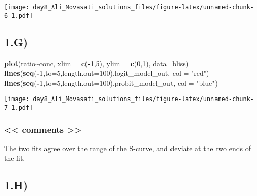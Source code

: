 \documentclass[
]{article}
\newenvironment{Shaded}{\begin{snugshade}}{\end{snugshade}}
\newcommand{\AttributeTok}[1]{\textcolor[rgb]{0.13,0.29,0.53}{#1}}
\newcommand{\DecValTok}[1]{\textcolor[rgb]{0.00,0.00,0.81}{#1}}
\newcommand{\FunctionTok}[1]{\textcolor[rgb]{0.13,0.29,0.53}{\textbf{#1}}}
\newcommand{\NormalTok}[1]{#1}
\newcommand{\SpecialCharTok}[1]{\textcolor[rgb]{0.81,0.36,0.00}{\textbf{#1}}}
\newcommand{\StringTok}[1]{\textcolor[rgb]{0.31,0.60,0.02}{#1}}
\begin{document}
\texttt{[image: day8\_Ali\_Movasati\_solutions\_files/figure-latex/unnamed-chunk-6-1.pdf]}

\subsection{1.G)}\label{g}

\begin{Shaded}
\begin{Highlighting}[]
\FunctionTok{plot}\NormalTok{(ratio}\SpecialCharTok{\textasciitilde{}}\NormalTok{conc, }\AttributeTok{xlim =} \FunctionTok{c}\NormalTok{(}\SpecialCharTok{{-}}\DecValTok{1}\NormalTok{,}\DecValTok{5}\NormalTok{), }\AttributeTok{ylim =} \FunctionTok{c}\NormalTok{(}\DecValTok{0}\NormalTok{,}\DecValTok{1}\NormalTok{), }\AttributeTok{data=}\NormalTok{bliss)}
\FunctionTok{lines}\NormalTok{(}\FunctionTok{seq}\NormalTok{(}\SpecialCharTok{{-}}\DecValTok{1}\NormalTok{,}\AttributeTok{to=}\DecValTok{5}\NormalTok{,}\AttributeTok{length.out=}\DecValTok{100}\NormalTok{),logit\_model\_out, }\AttributeTok{col =} \StringTok{"red"}\NormalTok{)}
\FunctionTok{lines}\NormalTok{(}\FunctionTok{seq}\NormalTok{(}\SpecialCharTok{{-}}\DecValTok{1}\NormalTok{,}\AttributeTok{to=}\DecValTok{5}\NormalTok{,}\AttributeTok{length.out=}\DecValTok{100}\NormalTok{),probit\_model\_out, }\AttributeTok{col =} \StringTok{"blue"}\NormalTok{)}
\end{Highlighting}
\end{Shaded}

\texttt{[image: day8\_Ali\_Movasati\_solutions\_files/figure-latex/unnamed-chunk-7-1.pdf]}

\subsubsection{\textless\textless{} comments
\textgreater\textgreater{}}\label{comments}

The two fits agree over the range of the S-curve, and deviate at the two
ends of the fit.

\subsection{1.H)}\label{h}
\end{document}
